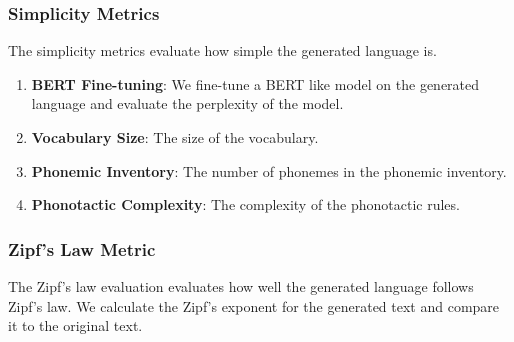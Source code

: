 \subsubsection{Simplicity Metrics}
The simplicity metrics evaluate how simple the generated language is.

\begin{enumerate}
	\item \textbf{BERT Fine-tuning}: We fine-tune a BERT like model on the generated language and evaluate the perplexity of the model.
	\item \textbf{Vocabulary Size}: The size of the vocabulary. 
	\item \textbf{Phonemic Inventory}: The number of phonemes in the phonemic inventory.
	\item \textbf{Phonotactic Complexity}: The complexity of the phonotactic rules.
\end{enumerate}

\subsubsection{Zipf's Law Metric}
The Zipf's law evaluation evaluates how well the generated language follows Zipf's law. We calculate the Zipf's exponent for the generated text and compare it to the original text.



